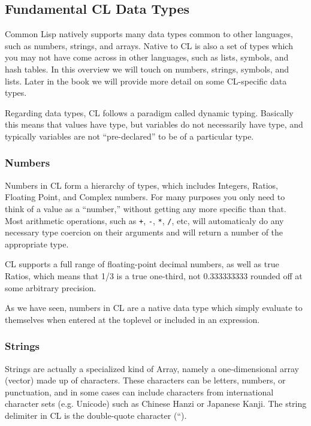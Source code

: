 \subsection{Fundamental CL Data Types}

Common Lisp natively supports many data types common to other languages, such as
numbers, strings, and arrays. Native to CL is also a set of types which you may not have
come across in other languages, such as lists, symbols, and hash tables. In this overview we
will touch on numbers, strings, symbols, and lists. Later in the book we will provide more
detail on some CL-specific data types.

Regarding data types, CL follows a paradigm called dynamic typing. Basically this
means that values have type, but variables do not necessarily have type, and typically
variables are not ``pre-declared'' to be of a particular type.

\subsubsection{Numbers}

Numbers in CL form a hierarchy of types, which includes Integers, Ratios, Floating Point,
and Complex numbers. For many purposes you only need to think of a value as a ``number,''
without getting any more specific than that. Most arithmetic operations, such as \texttt{+}, \texttt{-}, \texttt{*},
\texttt{/}, etc, will automaticaly do any necessary type coercion on their arguments and will return
a number of the appropriate type.

CL supports a full range of floating-point decimal numbers, as well as true Ratios,
which means that 1/3 is a true one-third, not 0.333333333 rounded off at some arbitrary
precision.

As we have seen, numbers in CL are a native data type which simply evaluate to themselves when entered at the toplevel or included in an expression.

\subsubsection{Strings}

Strings are actually a specialized kind of Array, namely a one-dimensional array (vector)
made up of characters. These characters can be letters, numbers, or punctuation, and in
some cases can include characters from international character sets (e.g. Unicode) such as
Chinese Hanzi or Japanese Kanji. The string delimiter in CL is the double-quote character
(``).

